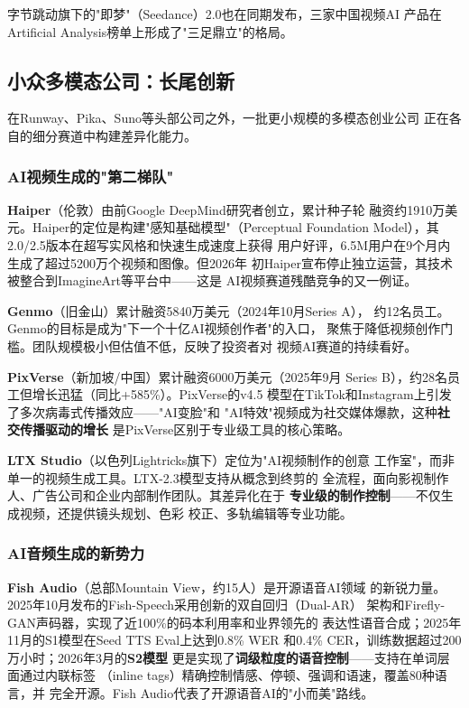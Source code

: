 字节跳动旗下的"即梦"（Seedance）2.0也在同期发布，三家中国视频AI
产品在Artificial Analysis榜单上形成了"三足鼎立"的格局。

\subsection{小众多模态公司：长尾创新}
\label{subsec:niche-multimodal}

在Runway、Pika、Suno等头部公司之外，一批更小规模的多模态创业公司
正在各自的细分赛道中构建差异化能力。

\subsubsection{AI视频生成的"第二梯队"}

\textbf{Haiper}（伦敦）由前Google DeepMind研究者创立，累计种子轮
融资约1910万美元。Haiper的定位是构建"感知基础模型"（Perceptual
Foundation Model），其2.0/2.5版本在超写实风格和快速生成速度上获得
用户好评，6.5M用户在9个月内生成了超过5200万个视频和图像。但2026年
初Haiper宣布停止独立运营，其技术被整合到ImagineArt等平台中——这是
AI视频赛道残酷竞争的又一例证。

\textbf{Genmo}（旧金山）累计融资5840万美元（2024年10月Series A），
约12名员工。Genmo的目标是成为"下一个十亿AI视频创作者"的入口，
聚焦于降低视频创作门槛。团队规模极小但估值不低，反映了投资者对
视频AI赛道的持续看好。

\textbf{PixVerse}（新加坡/中国）累计融资6000万美元（2025年9月
Series B），约28名员工但增长迅猛（同比+585\%）。PixVerse的v4.5
模型在TikTok和Instagram上引发了多次病毒式传播效应——"AI变脸"和
"AI特效"视频成为社交媒体爆款，这种\textbf{社交传播驱动的增长}
是PixVerse区别于专业级工具的核心策略。

\textbf{LTX Studio}（以色列Lightricks旗下）定位为"AI视频制作的创意
工作室"，而非单一的视频生成工具。LTX-2.3模型支持从概念到终剪的
全流程，面向影视制作人、广告公司和企业内部制作团队。其差异化在于
\textbf{专业级的制作控制}——不仅生成视频，还提供镜头规划、色彩
校正、多轨编辑等专业功能。

\subsubsection{AI音频生成的新势力}

\textbf{Fish Audio}（总部Mountain View，约15人）是开源语音AI领域
的新锐力量。2025年10月发布的Fish-Speech采用创新的双自回归（Dual-AR）
架构和Firefly-GAN声码器，实现了近100\%的码本利用率和业界领先的
表达性语音合成；2025年11月的S1模型在Seed TTS Eval上达到0.8\% WER
和0.4\% CER，训练数据超过200万小时；2026年3月的\textbf{S2模型}
更是实现了\textbf{词级粒度的语音控制}——支持在单词层面通过内联标签
（inline tags）精确控制情感、停顿、强调和语速，覆盖80种语言，并
完全开源。Fish Audio代表了开源语音AI的"小而美"路线。

